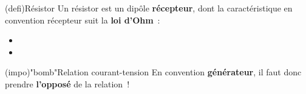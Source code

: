 \documentclass[../../main/main.tex]{subfiles}
\begin{document}
\begin{tcb*}[label=def:resistance, sidebyside](defi){Résistor}
	Un résistor est un dipôle \textbf{récepteur}, dont la caractéristique en
	convention récepteur suit la \textbf{loi d'Ohm}~:
	\psw{%
		\[
			\boxed{U=RI}
			\Lra
			\boxed{GU=I}
		\]
	}%
	\vspace{-15pt}
	\tcblower
	\begin{itemize}
		\item {}%
		\item {}%
	\end{itemize}
\end{tcb*}

\begin{tcb*}(impo)"bomb"{Relation courant-tension}
	En convention \textbf{générateur}, il faut donc prendre \textbf{l'opposé} de
	la relation~!
\end{tcb*}
\end{document}
